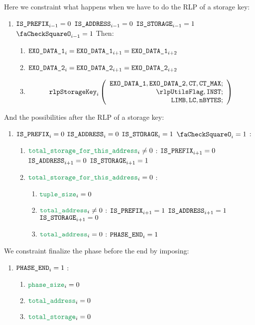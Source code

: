 \begin{enumerate}[resume]
		Here we constraint what happens when we have to do the RLP of a storage key:
		\begin{enumerate}[resume]
			\item \If $\texttt{IS\_PREFIX}_{i-1} = 0$ \et $\texttt{IS\_ADDRESS}_{i-1} = 0$ \et $\texttt{IS\_STORAGE}_{i-1} = 1$ \et $\done_{i-1} =1$ Then:
				\begin{enumerate}
					\item $\texttt{EXO\_DATA\_1}_{i} = \texttt{EXO\_DATA\_1}_{i+1} = \texttt{EXO\_DATA\_1}_{i+2}$
					\item $\texttt{EXO\_DATA\_2}_{i} = \texttt{EXO\_DATA\_2}_{i+1} = \texttt{EXO\_DATA\_2}_{i+2}$
					\item \[
							\rlpStorageKey_{i}
							\left(
							\begin{array}{r}
								\exoDataColumn{1},
								\exoDataColumn{2},
								\ct,
								\maxCt; \\
								\rlpUtilsFlag,
								\INST; \\
								\limb,
								\lc,
								\limbsize; \\
							\end{array}
							\right)
						\]
				\end{enumerate}
		\end{enumerate}
		And the possibilities after the RLP of a storage key:
		\begin{enumerate}[resume]
			\item \If $\texttt{IS\_PREFIX}_{i} = 0$ \et $\texttt{IS\_ADDRESS}_{i} = 0$ \et $\texttt{IS\_STORAGE}_{i} = 1$ \et $\done_{i} =1$ \Then:
				\begin{enumerate}
					\item \If $\locTotStorageForThisAddress_{i} \neq 0$ \Then: $\texttt{IS\_PREFIX}_{i+1} = 0$ \et $\texttt{IS\_ADDRESS}_{i+1} = 0$ \et $\texttt{IS\_STORAGE}_{i+1} = 1$
					\item \If $\locTotStorageForThisAddress_{i} = 0$ \Then:
						\begin{enumerate}
							\item $\locAccessListTupleSize_{i} = 0$
							\item \If $\locTotNbOfAddress_{i} \neq 0$ \Then: $\texttt{IS\_PREFIX}_{i+1} = 1$ \et $\texttt{IS\_ADDRESS}_{i+1} = 1$ \et $\texttt{IS\_STORAGE}_{i+1} = 0$
							\item \If $\locTotNbOfAddress_{i} = 0$ \Then: $\texttt{PHASE\_END}_{i} =1$
						\end{enumerate}
				\end{enumerate}
		\end{enumerate}

		We constraint finalize the phase before the end by imposing:
		\begin{enumerate}
			\item \If $\texttt{PHASE\_END}_{i} =1$ \Then:
				\begin{enumerate}
					\item $\locPhaseSize_{i} =0$
					\item $\locTotNbOfAddress_{i} =0$
					\item $\locTotNbOfStorage_{i} =0$
				\end{enumerate}
		\end{enumerate}


\end{enumerate}
